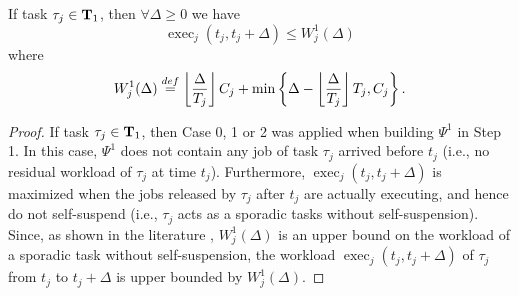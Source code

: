 \begin{Lemma}
\label{lemma:Wj1-exact}
If task $\tau_j \in {\bf T}_1$, then $\forall \Delta \geq 0$ we have 
\[
\operatorname{exec}_j(t_j, t_j+\Delta) \leq W_j^1(\Delta)
\]
where
{\footnotesize \begin{equation}
  \label{eq:execution-case1}
  W_j^1(\Delta) \stackrel{\mbox{def}}{=} \floor{\frac{\Delta}{T_j}}C_j + \min\left\{\Delta-\floor{\frac{\Delta}{T_j}}T_j, C_j\right\}.
\end{equation}}
\end{Lemma}
\begin{proof}
If task $\tau_j \in {\bf T}_1$, then Case 0, 1 or 2 was applied when building $\Psi^1$ in Step 1. %
  In this case, $\Psi^1$ does not contain any job of task $\tau_j$
  arrived before $t_j$ (i.e., no residual workload of $\tau_j$ at time $t_j$). Furthermore, $\operatorname{exec}_j(t_j, t_j+\Delta)$ is maximized when the jobs released by $\tau_j$ after $t_j$ are actually executing, and hence do not self-suspend (i.e., $\tau_j$ acts as a sporadic tasks without self-suspension). Since, as shown in the literature \cite{bertogna2006new}, $W_j^1(\Delta)$ is an upper bound on the workload of a sporadic task without self-suspension, the workload $\operatorname{exec}_j(t_j, t_j+\Delta)$ of $\tau_j$ from $t_j$ to $t_j+\Delta$ is upper bounded by $W_j^1(\Delta)$.
\end{proof}

